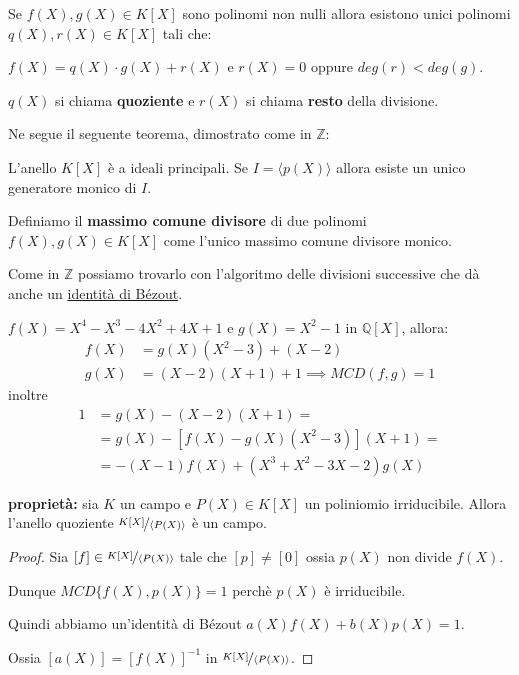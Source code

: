 \documentclass[../main.tex]{subfiles}
\begin{document}
Se $f(X), g(X) \in K[X]$ sono polinomi non nulli allora esistono unici polinomi $q(X), r(X) \in K[X]$ tali che:

$f(X) = q(X) \cdot g(X) + r(X)$ e $r(X) = 0$ oppure $deg(r) < deg(g)$.

$q(X)$ si chiama \textbf{quoziente} e $r(X)$ si chiama \textbf{resto} della divisione.

Ne segue il seguente teorema, dimostrato come in $\mathbb{Z}$:
\begin{theorem}
    L'anello $K[X]$ è a ideali principali. Se $I = \langle p(X)\rangle$ allora esiste un unico generatore monico di $I$.
\end{theorem}

\begin{definition}
    Definiamo il \textbf{massimo comune divisore} di due polinomi $f(X), g(X) \in K[X]$ come l'unico massimo comune divisore monico.
\end{definition}

Come in $\mathbb{Z}$ possiamo trovarlo con l'algoritmo delle divisioni successive che dà anche un \underline{identità di Bézout}.

\begin{example}
    $f(X) = X^4 - X^3 -4X^2 + 4X + 1$ e $g(X) = X^2 - 1$ in $\mathbb{Q}[X]$, allora:
    \begin{align*}
        f(X) & = g(X)(X^2 - 3) + (X - 2)                 \\
        g(X) & = (X - 2)(X + 1) +1 \implies MCD(f,g) = 1
    \end{align*}
    inoltre
    \begin{align*}
        1 & = g(X) - (X - 2)(X + 1) =                \\
          & = g(X) - [f(X) - g(X)(X^2 - 3)](X + 1) = \\
          & = -(X - 1)f(X) + (X^3 + X^2 - 3X -2)g(X)
    \end{align*}
\end{example}

\textbf{proprietà:} sia $K$ un campo e $P(X) \in K[X]$ un poliniomio irriducibile. Allora l'anello quoziente $\nicefrac{K[X]}{\langle P(X)\rangle}$ è un campo.

\begin{proof}
    Sia $[f] \in \nicefrac{K[X]}{\langle P(X)\rangle}$ tale che $[p] \neq [0]$ ossia $p(X)$ non divide $f(X)$.

    Dunque $MCD\{f(X),p(X)\} = 1$ perchè $p(X)$ è irriducibile.

    Quindi abbiamo un'identità di Bézout $a(X)f(X) + b(X)p(X) = 1$.

    Ossia $[a(X)] = [f(X)]^{-1}$ in $\nicefrac{K[X]}{\langle P(X)\rangle}$.
\end{proof}
\end{document}
